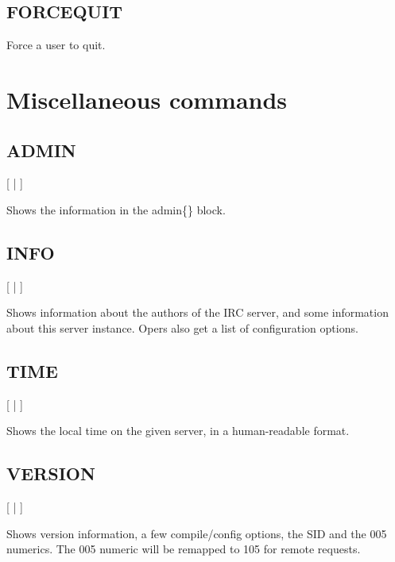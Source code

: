 \subsection{FORCEQUIT}

  
	       Force a user to quit.


\section{Miscellaneous commands}
\label{misccommands}

\subsection{ADMIN}

 [ | ]

	Shows the information in the admin\{\} block.


\subsection{INFO}

 [ | ]

	Shows information about the authors of the IRC server, and
	some information about this server instance.
	Opers also get a list of configuration options.


\subsection{TIME}

 [ | ]

	Shows the local time on the given server, in a human-{}readable format.


\subsection{VERSION}

	[ | ]

	Shows version information, a few compile/config options,
	the SID and the 005 numerics.
	The 005 numeric will be remapped to 105 for remote requests.


